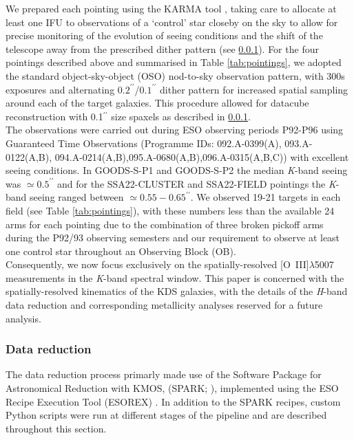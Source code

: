 \documentclass[fleqn,usenatbib]{mn2e}
\begin{document}
We prepared each pointing using the KARMA tool \citep{Wegner2008}, taking care to allocate at least one IFU to observations of a `control' star closeby on the sky to allow for precise monitoring of the evolution of seeing conditions and the shift of the telescope away from the prescribed dither pattern (see \cref{subsubsec:datareduction}).
For the four pointings described above and summarised in Table \ref{tab:pointings}, we adopted the standard object-sky-object (OSO) nod-to-sky observation pattern, with 300s exposures and alternating $0.2^{\prime\prime}$/$0.1^{\prime\prime}$ dither pattern for increased spatial sampling around each of the target galaxies.
This procedure allowed for datacube reconstruction with 0.1$^{\prime\prime}$ size spaxels as described in \cref{subsubsec:datareduction}. \\

The observations were carried out during ESO observing periods P92-P96 using Guaranteed Time Observations (Programme IDs: 092.A-0399(A), 093.A-0122(A,B), 094.A-0214(A,B),095.A-0680(A,B),096.A-0315(A,B,C)) with excellent seeing conditions.
In GOODS-S-P1 and GOODS-S-P2 the median {\it K}-band seeing was $\simeq0.5^{\prime\prime}$ and for the SSA22-CLUSTER and SSA22-FIELD pointings the {\it K}-band seeing ranged between $\simeq0.55-0.65^{\prime\prime}$.
We observed 19-21 targets in each field (see Table \ref{tab:pointings}), with these numbers less than the available 24 arms for each pointing due to the combination of three broken pickoff arms during the P92/93 observing semesters and our requirement to observe at least one control star throughout an Observing Block (OB). \\

Consequently, we now focus exclusively on the spatially-resolved [O~{\sc III}]$\lambda$5007 measurements in the {\it K}-band spectral window. 
This paper is concerned with the spatially-resolved kinematics of the KDS galaxies, with the details of the {\it H}-band data reduction and corresponding metallicity analyses reserved for a future analysis.


\subsubsection{Data reduction}\label{subsubsec:datareduction}

The data reduction process primarly made use of the Software Package for Astronomical Reduction with KMOS, (SPARK; \citealt{Davies2013}), implemented using the ESO Recipe Execution Tool (ESOREX) \citep{Freudling2013}.
In addition to the SPARK recipes, custom Python scripts were run at different stages of the pipeline and are described throughout this section.
\end{document}
